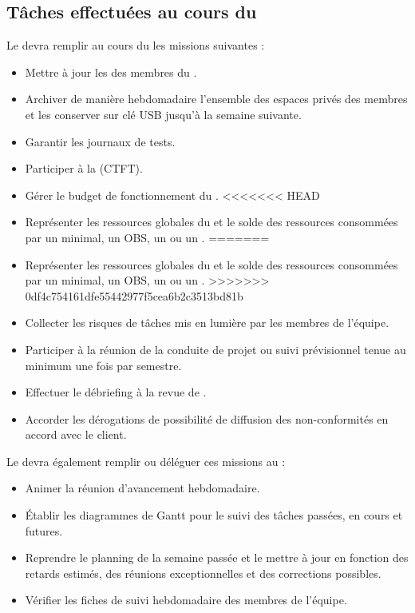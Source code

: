 \subsection*{Tâches effectuées au cours du \PICCourt}

Le \CP{} devra remplir au cours du \PICCourt les missions suivantes :

\begin{itemize}
	\item Mettre à jour les \FC{} des membres du \PICCourt.
	\item Archiver de manière hebdomadaire l’ensemble des espaces privés des membres et les conserver sur clé USB jusqu’à la semaine suivante.
	\item Garantir les journaux de tests.
	\item Participer à la \CTFT (CTFT).
	\item Gérer le budget de fonctionnement du \PICCourt.
<<<<<<< HEAD
	\item Représenter les ressources globales du \PICCourt et le solde des ressources consommées par un \WBSCourt minimal, un OBS, un \RBSCourt{} ou un \FBSCourt.
=======
	\item Représenter les ressources globales du \PICCourt et le solde des ressources consommées par un \WBSCourt{} minimal, un OBS, un \RBSCourt{} ou un \FBSCourt.
>>>>>>> 0df4c754161dfe55442977f5cea6b2c3513bd81b
	\item Collecter les risques de tâches mis en lumière par les membres de l’équipe.
	\item Participer à la réunion de la conduite de projet ou suivi prévisionnel tenue au minimum une fois par semestre.
	\item Effectuer le débriefing à la revue de \PICCourt.
	\item Accorder les dérogations de possibilité de diffusion des non-conformités en accord avec le client.
\end{itemize}

Le \CP{} devra également remplir ou déléguer ces missions au \CPA :
\begin{itemize}
	\item Animer la réunion d’avancement hebdomadaire.
	\item Établir les diagrammes de Gantt pour le suivi des tâches passées, en cours et futures.
	\item Reprendre le planning de la semaine passée et le mettre à jour en fonction des retards estimés, des réunions exceptionnelles et des corrections possibles.
	\item Vérifier les fiches de suivi hebdomadaire des membres de l’équipe.
\end{itemize}

